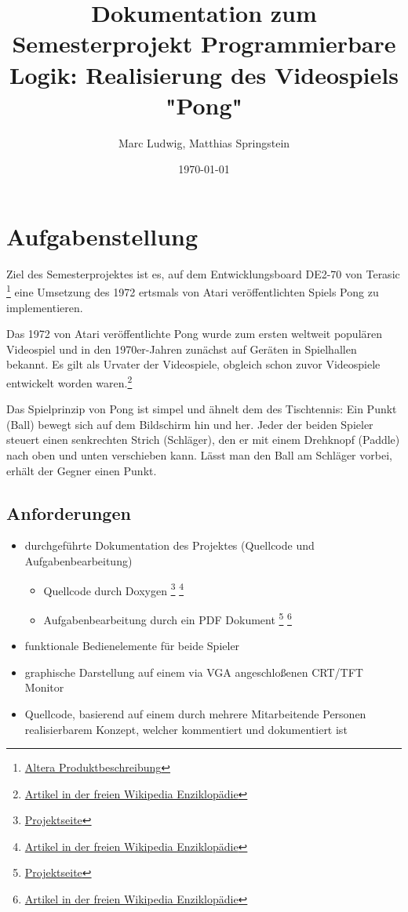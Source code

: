 \documentclass{article}
\title{Dokumentation zum Semesterprojekt Programmierbare Logik: Realisierung des Videospiels "Pong"}
\author{Marc Ludwig, Matthias Springstein}
\date{\today}
\begin{document}
\maketitle
\newpage

\tableofcontents
\newpage

\section{Aufgabenstellung}
Ziel des Semesterprojektes ist es, auf dem Entwicklungsboard DE2-70 von Terasic 
\footnote{\href{http://www.altera.com/education/univ/materials/boards/de2-70/unv-de2-70-board.html}{Altera Produktbeschreibung}}
eine Umsetzung des 1972 ertsmals von Atari veröffentlichten Spiels Pong zu implementieren.

Das 1972 von Atari veröffentlichte Pong wurde zum ersten weltweit populären Videospiel und in den 
1970er-Jahren zunächst auf Geräten in Spielhallen bekannt. Es gilt als Urvater der Videospiele, 
obgleich schon zuvor Videospiele entwickelt worden waren.\footnote{\href{http://de.wikipedia.org/wiki/Pong}{Artikel in der freien Wikipedia Enziklopädie}}

Das Spielprinzip von Pong ist simpel und ähnelt dem des Tischtennis: Ein Punkt (Ball) bewegt sich 
auf dem Bildschirm hin und her. Jeder der beiden Spieler steuert einen senkrechten Strich 
(Schläger), den er mit einem Drehknopf (Paddle) nach oben und unten verschieben kann. Lässt man 
den Ball am Schläger vorbei, erhält der Gegner einen Punkt.


\subsection{Anforderungen}
\begin{itemize}
  \item durchgeführte Dokumentation des Projektes (Quellcode und Aufgabenbearbeitung)
  	\begin{itemize} 
  	\item Quellcode durch Doxygen 
  		\footnote{\href{www.doxygen.org}{Projektseite}} 
  		\footnote{\href{http://de.wikipedia.org/wiki/Doxygen}{Artikel in der freien Wikipedia Enziklopädie}}
  	\item Aufgabenbearbeitung durch ein PDF Dokument
  		\footnote{\href{http://www.latex-project.org/}{Projektseite}}
  		\footnote{\href{http://de.wikipedia.org/wiki/LaTeX}{Artikel in der freien Wikipedia Enziklopädie}}
  	\end{itemize} 
  \item funktionale Bedienelemente für beide Spieler
  \item graphische Darstellung auf einem via VGA angeschloßenen CRT/TFT Monitor
  \item Quellcode, basierend auf einem durch mehrere Mitarbeitende Personen realisierbarem Konzept, 
  		welcher kommentiert und dokumentiert ist
\end{itemize}
\end{document}
